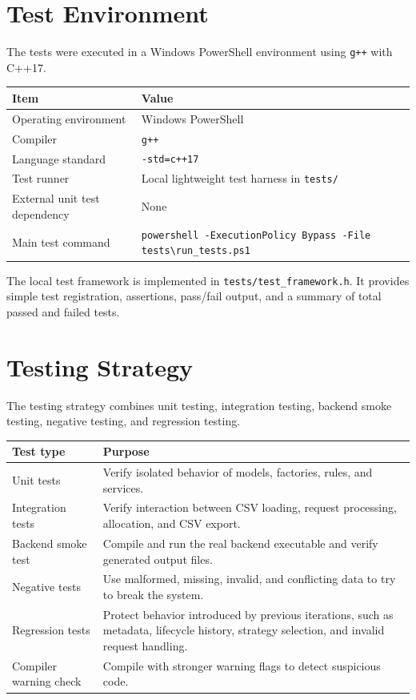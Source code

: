 \documentclass[12pt,a4paper]{article}
\begin{document}
\section{Test Environment}

The tests were executed in a Windows PowerShell environment using \texttt{g++} with C++17.

\begin{center}
\begin{tabularx}{\textwidth}{@{} p{4cm} X @{}}
\toprule
\textbf{Item} & \textbf{Value} \\
\midrule
Operating environment & Windows PowerShell \\
Compiler & \texttt{g++} \\
Language standard & \texttt{-std=c++17} \\
Test runner & Local lightweight test harness in \texttt{tests/} \\
External unit test dependency & None \\
Main test command & \texttt{powershell -ExecutionPolicy Bypass -File tests\textbackslash run\_tests.ps1} \\
\bottomrule
\end{tabularx}
\end{center}

The local test framework is implemented in \texttt{tests/test\_framework.h}. It provides simple test registration, assertions, pass/fail output, and a summary of total passed and failed tests.

\section{Testing Strategy}

The testing strategy combines unit testing, integration testing, backend smoke testing, negative testing, and regression testing.

\begin{center}
\begin{tabularx}{\textwidth}{@{} p{4cm} X @{}}
\toprule
\textbf{Test type} & \textbf{Purpose} \\
\midrule
Unit tests & Verify isolated behavior of models, factories, rules, and services. \\
Integration tests & Verify interaction between CSV loading, request processing, allocation, and CSV export. \\
Backend smoke test & Compile and run the real backend executable and verify generated output files. \\
Negative tests & Use malformed, missing, invalid, and conflicting data to try to break the system. \\
Regression tests & Protect behavior introduced by previous iterations, such as metadata, lifecycle history, strategy selection, and invalid request handling. \\
Compiler warning check & Compile with stronger warning flags to detect suspicious code. \\
\bottomrule
\end{tabularx}
\end{center}
\end{document}
